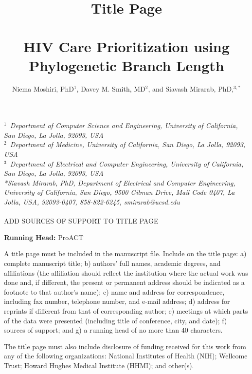 \documentclass[a4paper,10pt]{article}
\newcommand{\TODO}[1]{{\color{red} #1} }
\begin{document}
\title{Title Page\\~\\HIV Care Prioritization using Phylogenetic Branch Length}

\author{Niema Moshiri, PhD$^{1}$, Davey M. Smith, MD$^{2}$, and
Siavash Mirarab, PhD,$^{3,\ast}$\\[4pt]}
\date{}

\maketitle

\textit{$^{1}$~Department of Computer Science and Engineering, University of California, San Diego, La Jolla, 92093, USA}
\\
\textit{$^{2}$~Department of Medicine, University of California, San Diego, La Jolla, 92093, USA}
\\
\textit{$^{3}$~Department of Electrical and Computer Engineering, University of California, San Diego, La Jolla, 92093, USA}
\\[2pt]

\textit{*Siavash Mirarab, PhD, Department of Electrical and Computer Engineering, University of California, San Diego, 9500 Gilman Drive, Mail Code 0407, La Jolla, USA, 92093-0407, 858-822-6245, smirarab@ucsd.edu}\\~\\

\TODO{ADD SOURCES OF SUPPORT TO TITLE PAGE}

\textbf{Running Head:} ProACT

\TODO{A title page must be included in the manuscript file. Include on the title page: a) complete manuscript title; b) authors' full names, academic degrees, and affiliations (the affiliation should reflect the institution where the actual work was done and, if different, the present or permanent address should be indicated as a footnote to that author's name); c) name and address for correspondence, including fax number, telephone number, and e-mail address; d) address for reprints if different from that of corresponding author; e) meetings at which parts of the data were presented (including title of conference, city, and date); f) sources of support; and g) a running head of no more than 40 characters.

The title page must also include disclosure of funding received for this work from any of the following organizations: National Institutes of Health (NIH); Wellcome Trust; Howard Hughes Medical Institute (HHMI); and other(s).}
\end{document}
